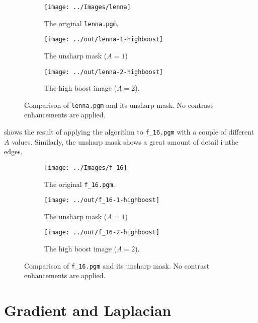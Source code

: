 \documentclass[headings=optiontoheadandtoc,listof=totoc,parskip=full]{scrartcl}
\begin{document}
\begin{figure}[H]
	\centering
	\begin{subfigure}[t]{.3\textwidth}
		\centering
		\texttt{[image: ../Images/lenna]}
		\caption{The original \texttt{lenna.pgm}.}
	\end{subfigure}
	\hfill
	\begin{subfigure}[t]{.3\textwidth}
		\centering
		\texttt{[image: ../out/lenna-1-highboost]}
		\caption{The unsharp mask ($A = 1$)}
	\end{subfigure}
	\hfill
	\begin{subfigure}[t]{.3\textwidth}
		\centering
		\texttt{[image: ../out/lenna-2-highboost]}
		\caption{The high boost image ($A = 2$).}
	\end{subfigure}
	\caption{Comparison of \texttt{lenna.pgm} and its unsharp mask. No contrast enhancements are applied.}
	\label{fig:unsharp-lenna}
\end{figure}

 shows the result of applying the algorithm to \texttt{f\_16.pgm} with a couple of different $A$ values. Similarly, the unsharp mask shows a great amount of detail i nthe edges.

\begin{figure}[H]
	\centering
	\begin{subfigure}[t]{.3\textwidth}
		\centering
		\texttt{[image: ../Images/f\_16]}
		\caption{The original \texttt{f\_16.pgm}.}
	\end{subfigure}
	\hfill
	\begin{subfigure}[t]{.3\textwidth}
		\centering
		\texttt{[image: ../out/f\_16-1-highboost]}
		\caption{The unsharp mask ($A = 1$)}
	\end{subfigure}
	\hfill
	\begin{subfigure}[t]{.3\textwidth}
		\centering
		\texttt{[image: ../out/f\_16-2-highboost]}
		\caption{The high boost image ($A = 2$).}
	\end{subfigure}
	\caption{Comparison of \texttt{f\_16.pgm} and its unsharp mask. No contrast enhancements are applied.}
	\label{fig:unsharp-f_16}
\end{figure}


\section{Gradient and Laplacian}
\label{sec:gradient}
\end{document}
